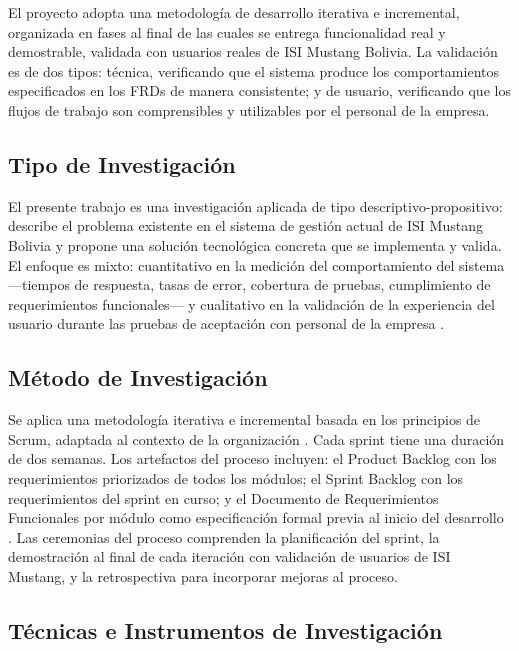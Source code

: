 \documentclass{univalle-perfil}
\begin{document}
El proyecto adopta una metodología de desarrollo iterativa e incremental, organizada en fases al final de las cuales se entrega funcionalidad real y demostrable, validada con usuarios reales de ISI Mustang Bolivia. La validación es de dos tipos: técnica, verificando que el sistema produce los comportamientos especificados en los FRDs de manera consistente; y de usuario, verificando que los flujos de trabajo son comprensibles y utilizables por el personal de la empresa.

\subsection{Tipo de Investigación}

El presente trabajo es una investigación aplicada de tipo descriptivo-propositivo: describe el problema existente en el sistema de gestión actual de ISI Mustang Bolivia y propone una solución tecnológica concreta que se implementa y valida. El enfoque es mixto: cuantitativo en la medición del comportamiento del sistema —tiempos de respuesta, tasas de error, cobertura de pruebas, cumplimiento de requerimientos funcionales— y cualitativo en la validación de la experiencia del usuario durante las pruebas de aceptación con personal de la empresa \parencite{pressman2014}.

\subsection{Método de Investigación}

Se aplica una metodología iterativa e incremental basada en los principios de Scrum, adaptada al contexto de la organización \parencite{larman2004}. Cada sprint tiene una duración de dos semanas. Los artefactos del proceso incluyen: el Product Backlog con los requerimientos priorizados de todos los módulos; el Sprint Backlog con los requerimientos del sprint en curso; y el Documento de Requerimientos Funcionales por módulo como especificación formal previa al inicio del desarrollo \parencite{wiegers2013}. Las ceremonias del proceso comprenden la planificación del sprint, la demostración al final de cada iteración con validación de usuarios de ISI Mustang, y la retrospectiva para incorporar mejoras al proceso.

\subsection{Técnicas e Instrumentos de Investigación}
\end{document}
